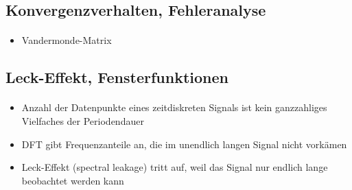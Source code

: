 \subsection{Konvergenzverhalten, Fehleranalyse}
\begin{frame}{\insertsection}
	\framesubtitle{\insertsubsection}
	
	\begin{itemize}
		\item Vandermonde-Matrix
	\end{itemize}
\end{frame}

\subsection{Leck-Effekt, Fensterfunktionen}
\begin{frame}{\insertsection}
	\framesubtitle{\insertsubsection}
	
	\begin{itemize}
		\item Anzahl der Datenpunkte eines zeitdiskreten Signals ist kein ganzzahliges Vielfaches der Periodendauer
		\item DFT gibt Frequenzanteile an, die im unendlich langen Signal nicht vorkämen
		\item Leck-Effekt (spectral leakage) tritt auf, weil das Signal nur endlich lange beobachtet werden kann
	\end{itemize}
	

\end{frame}

